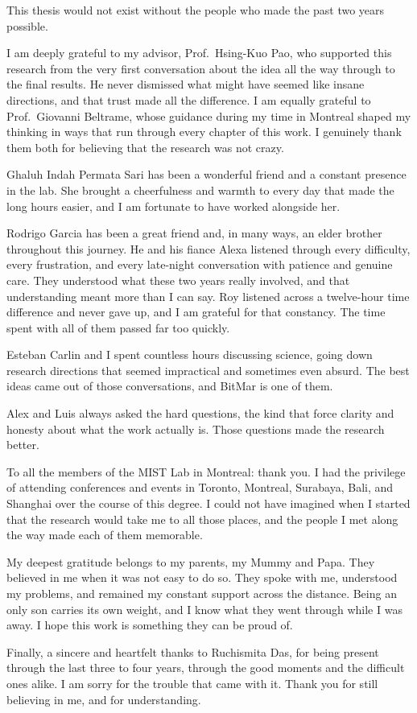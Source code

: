 This thesis would not exist without the people who made the past two years possible.

I am deeply grateful to my advisor, Prof.~Hsing-Kuo Pao, who supported this research from the very first conversation about the idea all the way through to the final results. He never dismissed what might have seemed like insane directions, and that trust made all the difference. I am equally grateful to Prof.~Giovanni Beltrame, whose guidance during my time in Montreal shaped my thinking in ways that run through every chapter of this work. I genuinely thank them both for believing that the research was not crazy.

Ghaluh Indah Permata Sari has been a wonderful friend and a constant presence in the lab. She brought a cheerfulness and warmth to every day that made the long hours easier, and I am fortunate to have worked alongside her.

Rodrigo Garcia has been a great friend and, in many ways, an elder brother throughout this journey. He and his fiance Alexa listened through every difficulty, every frustration, and every late-night conversation with patience and genuine care. They understood what these two years really involved, and that understanding meant more than I can say. Roy listened across a twelve-hour time difference and never gave up, and I am grateful for that constancy. The time spent with all of them passed far too quickly.

Esteban Carlin and I spent countless hours discussing science, going down research directions that seemed impractical and sometimes even absurd. The best ideas came out of those conversations, and BitMar is one of them.

Alex and Luis always asked the hard questions, the kind that force clarity and honesty about what the work actually is. Those questions made the research better.

To all the members of the MIST Lab in Montreal: thank you. I had the privilege of attending conferences and events in Toronto, Montreal, Surabaya, Bali, and Shanghai over the course of this degree. I could not have imagined when I started that the research would take me to all those places, and the people I met along the way made each of them memorable.

My deepest gratitude belongs to my parents, my Mummy and Papa. They believed in me when it was not easy to do so. They spoke with me, understood my problems, and remained my constant support across the distance. Being an only son carries its own weight, and I know what they went through while I was away. I hope this work is something they can be proud of.

Finally, a sincere and heartfelt thanks to Ruchismita Das, for being present through the last three to four years, through the good moments and the difficult ones alike. I am sorry for the trouble that came with it. Thank you for still believing in me, and for understanding.
